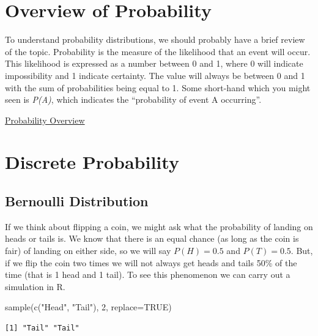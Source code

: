 \documentclass[
  letterpaper,
  DIV=11,
  numbers=noendperiod]{scrreprt}
\newenvironment{Shaded}{\begin{snugshade}}{\end{snugshade}}
\newcommand{\AttributeTok}[1]{\textcolor[rgb]{0.40,0.45,0.13}{#1}}
\newcommand{\ConstantTok}[1]{\textcolor[rgb]{0.56,0.35,0.01}{#1}}
\newcommand{\DecValTok}[1]{\textcolor[rgb]{0.68,0.00,0.00}{#1}}
\newcommand{\FunctionTok}[1]{\textcolor[rgb]{0.28,0.35,0.67}{#1}}
\newcommand{\NormalTok}[1]{\textcolor[rgb]{0.00,0.23,0.31}{#1}}
\newcommand{\StringTok}[1]{\textcolor[rgb]{0.13,0.47,0.30}{#1}}
\begin{document}
\section{Overview of Probability}\label{overview-of-probability}

To understand probability distributions, we should probably have a brief
review of the topic. Probability is the measure of the likelihood that
an event will occur. This likelihood is expressed as a number between 0
and 1, where 0 will indicate impossibility and 1 indicate certainty. The
value will always be between 0 and 1 with the sum of probabilities being
equal to 1. Some short-hand which you might seen is \emph{P(A)}, which
indicates the ``probability of event A occurring''.

\begin{watch}{}{}
    \href{https://youtu.be/BxHJLWyJWZo}{Probability Overview}
\end{watch}

\section{Discrete Probability}\label{discrete-probability}

\subsection{Bernoulli Distribution}\label{bernoulli-distribution}

If we think about flipping a coin, we might ask what the probability of
landing on heads or tails is. We know that there is an equal chance (as
long as the coin is fair) of landing on either side, so we will say
\(P(H)=0.5\) and \(P(T)=0.5\). But, if we flip the coin two times we
will not always get heads and tails 50\% of the time (that is 1 head and
1 tail). To see this phenomenon we can carry out a simulation in R.

\begin{Shaded}
\begin{Highlighting}[]
\FunctionTok{sample}\NormalTok{(}\FunctionTok{c}\NormalTok{(}\StringTok{"Head"}\NormalTok{, }\StringTok{"Tail"}\NormalTok{), }\DecValTok{2}\NormalTok{, }\AttributeTok{replace=}\ConstantTok{TRUE}\NormalTok{)}
\end{Highlighting}
\end{Shaded}

\begin{verbatim}
[1] "Tail" "Tail"
\end{verbatim}
\end{document}
